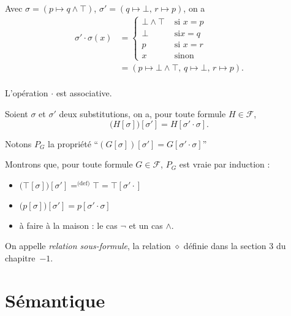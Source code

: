 \begin{exm}
	Avec $\sigma = ( p \mapsto q \land \top )$, $\sigma' = (q \mapsto \bot,\,r \mapsto p)$, on a
	\begin{align*}
		\sigma' \cdot \sigma (x) &= \begin{cases}
			\bot \land \top &\text{ si } x = p\\
			\bot &\text{ si} x = q\\
			p &\text{ si } x = r\\
			x &\text{ sinon}
		\end{cases}\\
		&= (p\mapsto \bot \land \top,\,q\mapsto \bot,\, r \mapsto p). \\
	\end{align*}
\end{exm}

\begin{rmk}
	L'opération $\cdot$\/ est associative.
\end{rmk}

\begin{prop}
	Soient $\sigma$\/ et $\sigma'$\/ deux substitutions, on a, pour toute formule $H \in \mathcal{F}$, \[
		\big(H[\sigma]\big)[\sigma'] = H[\sigma' \cdot \sigma]
	.\]
\end{prop}

\begin{prv}
	Notons $P_G$\/ la propriété \hfill ``$(G[\sigma])[\sigma'] = G[\sigma' \cdot \sigma]$\/'' \hfill\hbox{}

	Montrons que, pour toute formule $G \in \mathcal{F}$, $P_G$\/ est vraie par induction : 
	\begin{itemize}
		\item $\big(\top[\sigma]\big)[\sigma'] \mathrel{\mathop=^{\text{(def)}}} \top = \top[\sigma' \cdot]$\/
		\item $\big(p[\sigma]\big)[\sigma'] = p[\sigma' \cdot \sigma]$\/ 
		\item à faire à la maison : le cas $\lnot $\/ et un cas $\land$.
	\end{itemize}
\end{prv}

\begin{defn}
	On appelle {\it relation sous-formule}, la relation $\diamond$ définie dans la section 3 du chapitre~$-\text{1}$.
\end{defn}

\section{Sémantique}

